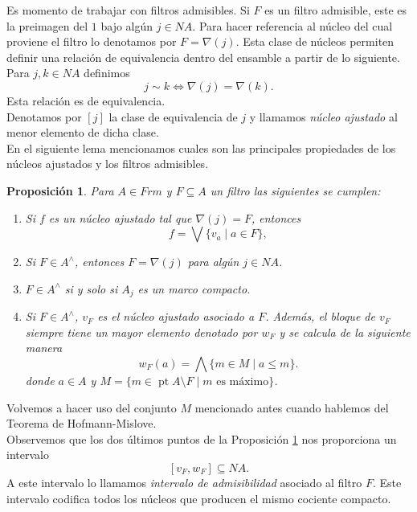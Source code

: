 \documentclass[12pt]{article}
\newtheorem{prop}[thm]{Proposición}
\DeclareMathOperator{\pt}{pt}
\begin{document}
Es momento de trabajar con filtros admisibles. Si $F$ es un filtro admisible, este es la preimagen del $1$ bajo algún $j\in NA$. Para hacer referencia al núcleo del cual proviene el 
filtro lo denotamos por $F=\nabla(j)$. Esta clase de núcleos permiten definir una relación de equivalencia dentro del ensamble a partir de lo siguiente. 
Para $j, k\in NA$ definimos
\[
j\sim k\iff  \nabla(j)=\nabla(k).
\]
Esta relación es de equivalencia.\\

Denotamos por $[j]$ la clase de equivalencia de $j$ y llamamos \emph{núcleo ajustado} al menor elemento de dicha clase.\\

En el siguiente lema mencionamos cuales son las principales propiedades de los núcleos ajustados y los filtros admisibles.

\begin{prop}\label{Fadmisiblesynucleosaju}
Para $A\in Frm$ y $F\subseteq A$ un filtro las siguientes se cumplen:
\begin{enumerate}
\item Si $f$ es un núcleo ajustado tal que $\nabla(j)=F$, entonces 
\[
f=\bigvee\{v_a\mid a\in F\},
\]
\item Si $F\in A^\wedge$, entonces $F=\nabla(j)$ para algún $j\in NA$.
\item $F\in A^\wedge$ si y solo si $A_j$ es un marco compacto.
\item Si $F\in A^\wedge$, $v_F$ es el núcleo ajustado asociado a $F$. Además, el bloque de $v_F$ siempre tiene un mayor elemento denotado por $w_F$ y se calcula de la siguiente manera 
\begin{equation}\label{wF}
w_F(a)=\bigwedge\{m\in M\mid a\leq m\}.
\end{equation}
donde $a\in A$ y $M=\{m\in \pt A\setminus F\mid m \text{ es máximo}\}$.
\end{enumerate}
\end{prop}

Volvemos a hacer uso del conjunto $M$ mencionado antes cuando hablemos del Teorema de Hofmann-Mislove.\\

Observemos que los dos últimos puntos de la Proposición \ref{Fadmisiblesynucleosaju} nos proporciona un intervalo 
\begin{equation}\label{Intervalo}
    [v_F, w_F]\subseteq NA.
\end{equation}    
A este intervalo lo llamamos \emph{intervalo de admisibilidad} asociado al filtro $F$. Este intervalo codifica todos los núcleos que producen el mismo cociente compacto.\\
\end{document}
